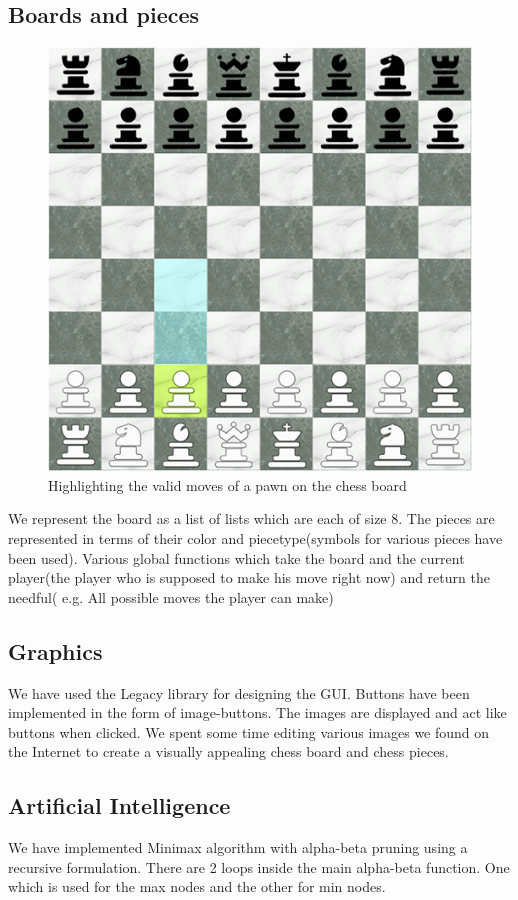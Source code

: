 \documentclass[11pt]{article}
\begin{document}
\subsection{Boards and pieces}
\begin{figure}[h!]
	\caption{Highlighting the valid moves of a pawn on the chess board}
	\centering
	\includegraphics{snap3}
	\end{figure}
	We represent the board as a list of lists which are each of size 8. The pieces are represented in terms of their color and piecetype(symbols for various pieces have been used).
	Various global functions which take the board and the current player(the player who is supposed to make his move right now) and return the needful( e.g. All possible moves the player can make)

\subsection{Graphics}
	We have used the Legacy library for designing the GUI. Buttons have been implemented in the form of image-buttons. The images are displayed and act like buttons when clicked. We spent some time editing various images we found on the Internet to create a visually appealing chess board and chess pieces.

\subsection{Artificial Intelligence}	
We have implemented Minimax algorithm with alpha-beta pruning using a recursive formulation. There are 2 loops inside the main alpha-beta function. One which is used for the max nodes and the other for min nodes.
\end{document}
